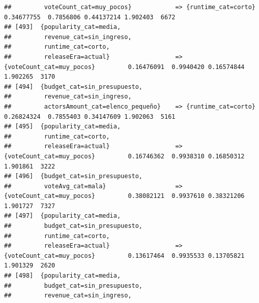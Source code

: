 \documentclass[
]{article}
\begin{document}
\begin{verbatim}
##         voteCount_cat=muy_pocos}            => {runtime_cat=corto}               0.34677755  0.7856806 0.44137214 1.902403  6672
## [493]  {popularity_cat=media,                                                                                                   
##         revenue_cat=sin_ingreso,                                                                                                
##         runtime_cat=corto,                                                                                                      
##         releaseEra=actual}                  => {voteCount_cat=muy_pocos}         0.16476091  0.9940420 0.16574844 1.902265  3170
## [494]  {budget_cat=sin_presupuesto,                                                                                             
##         revenue_cat=sin_ingreso,                                                                                                
##         actorsAmount_cat=elenco_pequeño}    => {runtime_cat=corto}               0.26824324  0.7855403 0.34147609 1.902063  5161
## [495]  {popularity_cat=media,                                                                                                   
##         runtime_cat=corto,                                                                                                      
##         releaseEra=actual}                  => {voteCount_cat=muy_pocos}         0.16746362  0.9938310 0.16850312 1.901861  3222
## [496]  {budget_cat=sin_presupuesto,                                                                                             
##         voteAvg_cat=mala}                   => {voteCount_cat=muy_pocos}         0.38082121  0.9937610 0.38321206 1.901727  7327
## [497]  {popularity_cat=media,                                                                                                   
##         budget_cat=sin_presupuesto,                                                                                             
##         runtime_cat=corto,                                                                                                      
##         releaseEra=actual}                  => {voteCount_cat=muy_pocos}         0.13617464  0.9935533 0.13705821 1.901329  2620
## [498]  {popularity_cat=media,                                                                                                   
##         budget_cat=sin_presupuesto,                                                                                             
##         revenue_cat=sin_ingreso,                                                                                                

\end{verbatim}
\end{document}
